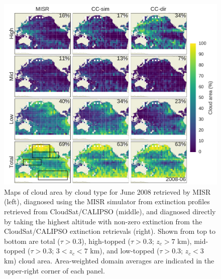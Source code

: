 \begin{figure}
\centering
\includegraphics[width=\columnwidth]{graphics/misr_cldmisr_maps_2008-06.pdf}
\caption{Maps of cloud area by cloud type for June 2008 retrieved by MISR (left), diagnosed using the MISR simulator from extinction profiles retrieved from CloudSat/CALIPSO (middle), and diagnosed directly by taking the highest altitude with non-zero extinction from the CloudSat/CALIPSO extinction retrievals (right). Shown from top to bottom are total ($\tau > 0.3$), high-topped ($\tau > 0.3$; $z_c > 7$ km), mid-topped ($\tau > 0.3$; $3 < z_c < 7$ km), and low-topped ($\tau > 0.3$; $z_c < 3$ km) cloud area. Area-weighted domain averages are indicated in the upper-right corner of each panel.}
\label{misr_cldmisr_maps_june}
\end{figure}

